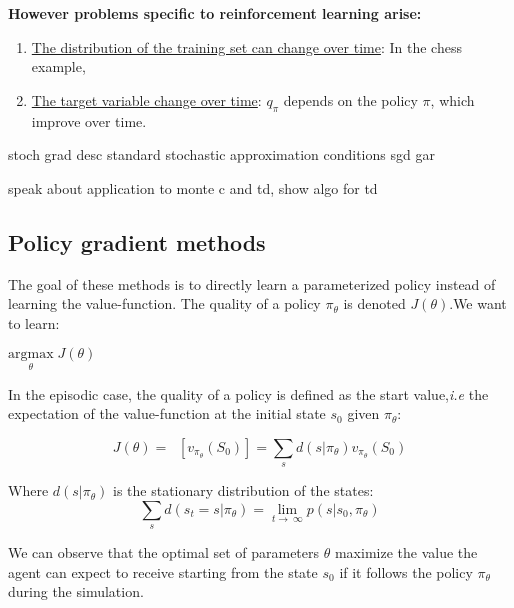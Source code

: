 \documentclass[11pt, onecolumn, a4paper]{report}
\begin{document}
\textbf{However problems specific to reinforcement learning arise:}

\begin{enumerate}
    \item \underline{The distribution of the training set can change over time}: In the chess example, %
    \item \underline{The target variable change over time}: $q_\pi$ depends on the  policy $\pi$, which improve over time.
\end{enumerate}

 stoch grad desc
standard stochastic approximation conditions sgd gar

speak about application to monte c and td,
show algo for td



\subsection{Policy gradient methods}

The goal of these methods is to directly learn a parameterized policy instead of learning the value-function. The quality of a policy $\pi_\theta$ is denoted $J(\theta)$.We want to learn:

\begin{center}
     $\underset{\theta}{\mathrm{argmax}} \; J(\theta)$
\end{center}

In the episodic case, the quality of a policy is defined as the start value,\textit{i.e} the expectation of the value-function at the initial state $s_0$ given $\pi_\theta$:

\begin{center}
$$J(\theta)= \mathop{\mathbb{E_\pi}}[v_{\pi_{\theta}}(S_0)] = \sum_s d(s|\pi_\theta)v_{\pi_{\theta}}(S_0)$$   \end{center}
Where $d(s|\pi_\theta)$ is the stationary distribution of the states: $$\sum_s d(s_t=s|\pi_\theta)= \lim_{t\to\ \infty} p(s|s_0,\pi_\theta)$$

We can observe that the optimal set of parameters $\theta$ maximize the value the agent can expect to receive starting from the state $s_0$ if it follows the policy $\pi_\theta$ during the simulation.\\
\end{document}

